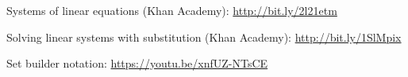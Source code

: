 \begin{readinessAssuranceResources}
\item Systems of linear equations (Khan Academy):
      \url{http://bit.ly/2l21etm}
\item Solving linear systems with substitution (Khan Academy):
      \url{http://bit.ly/1SlMpix}
\item Set builder notation:
		\url{https://youtu.be/xnfUZ-NTsCE}
\end{readinessAssuranceResources}
